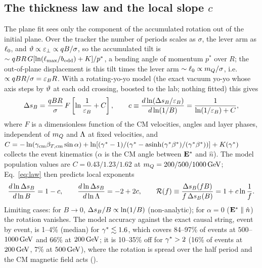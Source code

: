 \subsection{The thickness law and the local slope $c$}\label{sec:string:law}
The plane fit sees only the component of the accumulated rotation out of the initial plane. Over the tracker the number
of periods scales as $\sigma$, the lever arm as $\ell_0$, and $\vartheta\propto\varepsilon_\perp\propto qB/\sigma$, so the accumulated
tilt is $\sim qBR\,G[\ln(\ell_{\max}/b_{\rm odd})+K]/p^*$, a bending angle of momentum $p^*$ over $R$; the out-of-plane
displacement is this tilt times the lever arm $\sim\ell_0\propto m_Q/\sigma$, i.e.\ $\propto qBR/\sigma=\varepsilon_B R$. With a
rotating-yo-yo model (the exact vacuum yo-yo whose axis steps by $\vartheta$ at each odd crossing, boosted to the lab; nothing
fitted) this gives
\begin{equation}
  \Delta s_B=\frac{qBR}{\sigma}\,F\left[\ln\frac{1}{\varepsilon_B}+C\right],\qquad
  c\equiv\frac{d\ln(\Delta s_B/\varepsilon_B)}{d\ln(1/B)}=\frac{1}{\ln(1/\varepsilon_B)+C},
  \label{eq:law}
\end{equation}
where $F$ is a dimensionless function of the CM velocities, angles and layer phases, independent of $m_Q$ and $\Lambda$ at
fixed velocities, and $C=-\ln(\gamma_{\rm cm}\beta_{T,\rm cm}\sin\alpha)+\ln[(\gamma^*-1)/(\gamma^*-\operatorname{asinh}(\gamma^*\beta^*)
/(\gamma^*\beta^*))]+K(\gamma^*)$ collects the event kinematics ($\alpha$ is the CM angle between $\mathbf{E}^*$ and $\hat n$). The model
population values are $C=0.43/1.23/1.62$ at $m_Q=200/500/1000\,\mathrm{GeV}$; Eq.~\eqref{eq:law} then predicts local exponents
\begin{equation}
  \frac{d\ln\Delta s_B}{d\ln B}=1-c,\qquad \frac{d\ln\Delta s_B}{d\ln\Lambda}=-2+2c,\qquad \mathcal R(f)\equiv\frac{\Delta s_B(fB)}{f\,\Delta s_B(B)}=1+c\ln\frac1f .
  \label{eq:exponents}
\end{equation}
Limiting cases: for $B\to0$, $\Delta s_B/B\propto\ln(1/B)$ (non-analytic); for $\alpha=0$ ($\mathbf{E}^*\parallel\hat n$) the
rotation vanishes. The model accuracy against the exact causal string, event by event, is 1--4\% (median) for
$\gamma^*\lesssim1.6$, which covers 84--97\% of events at $500$--$1000\,\mathrm{GeV}$ and 66\% at $200\,\mathrm{GeV}$; it is 10--35\% off for
$\gamma^*>2$ (16\% of events at $200\,\mathrm{GeV}$, 7\% at $500\,\mathrm{GeV}$), where the rotation is spread over the half period and the CM
magnetic field acts (\EST{}).

